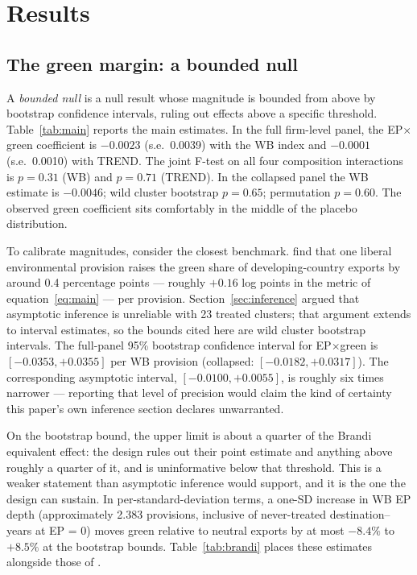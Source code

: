 \documentclass[12pt]{article}
\begin{document}
\section{Results}\label{sec:results}

\subsection{The green margin: a bounded null}\label{sec:green}

A \emph{bounded null} is a null result whose magnitude is bounded from above by
bootstrap confidence intervals, ruling out effects above a specific threshold.
Table~\ref{tab:main} reports the main estimates. In the full firm-level panel, the
EP$\times$green coefficient is $-0.0023$ (s.e.\ 0.0039) with the WB index and $-0.0001$
(s.e.\ 0.0010) with TREND. The joint F-test on all four composition interactions is
$p = 0.31$ (WB) and $p = 0.71$ (TREND). In the collapsed panel the WB estimate is
$-0.0046$; wild cluster bootstrap $p = 0.65$; permutation $p = 0.60$. The observed
green coefficient sits comfortably in the middle of the placebo distribution.

\begin{table}[htbp]
\centering
\caption{Triple-difference estimates: EP content and export composition}
\label{tab:main}

\end{table}

To calibrate magnitudes, consider the closest benchmark. \citet{brandi2020} find that one liberal
environmental provision raises the green share of developing-country exports by around
0.4 percentage points --- roughly $+0.16$ log points in the metric of
equation~\eqref{eq:main} --- per provision. Section~\ref{sec:inference} argued that
asymptotic inference is unreliable with 23 treated clusters; that argument extends to
interval estimates, so the bounds cited here are wild cluster bootstrap intervals. The
full-panel 95\% bootstrap confidence interval for EP$\times$green is $[-0.0353, +0.0355]$
per WB provision (collapsed: $[-0.0182, +0.0317]$). The corresponding asymptotic
interval, $[-0.0100, +0.0055]$, is roughly six times narrower --- reporting that level
of precision would claim the kind of certainty this paper's own inference section
declares unwarranted.

On the bootstrap bound, the upper limit is about a quarter of the Brandi equivalent
effect: the design rules out their point estimate and anything above roughly a quarter of
it, and is uninformative below that threshold. This is a weaker statement than asymptotic
inference would support, and it is the one the design can sustain. In per-standard-deviation
terms, a one-SD increase in WB EP depth (approximately 2.383 provisions, inclusive of
never-treated destination--years at EP = 0) moves green relative to neutral exports by at
most $-8.4\%$ to $+8.5\%$ at the bootstrap bounds.
Table~\ref{tab:brandi} places these estimates alongside those of \citet{brandi2020}.
\end{document}
